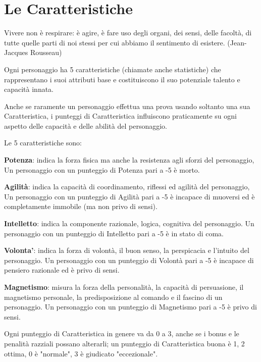 \documentclass[a4paper,11pt,twoside,openany]{book}
\begin{document}
\section{Le Caratteristiche}

\label{le-caratteristiche}

\begin{tcolorbox}[enhanced,arc=5pt,boxrule=0.3pt]{Vivere non è respirare: è agire, è fare uso degli organi, dei sensi, delle facoltà, di tutte quelle parti di noi stessi per cui abbiamo il sentimento di esistere. (Jean-Jacques Rousseau)}\end{tcolorbox}\medskip

Ogni personaggio ha 5 caratteristiche (chiamate anche statistiche) che rappresentano i suoi attributi base e costituiscono il suo potenziale talento e capacità innata.

Anche se raramente un personaggio effettua una prova usando soltanto una sua Caratteristica, i punteggi di Caratteristica influiscono praticamente su ogni aspetto delle capacità e delle abilità del personaggio.

Le 5 caratteristiche sono:

\textbf{Potenza}: indica la forza fisica ma anche la resistenza agli sforzi del personaggio, Un personaggio con un punteggio di Potenza pari a -5 è morto.

\textbf{Agilità}: indica la capacità di coordinamento, riflessi ed agilità del personaggio, Un personaggio con un punteggio di Agilità pari a -5 è incapace di muoversi ed è completamente immobile (ma non privo di sensi).

\textbf{Intelletto}: indica la componente razionale, logica, cognitiva del personaggio. Un personaggio con un punteggio di Intelletto pari a -5 è in stato di coma.

\textbf{Volonta'}: indica la forza di volontà, il buon senso, la perspicacia e l'intuito del personaggio. Un personaggio con un punteggio di Volontà pari a -5 è incapace di pensiero razionale ed è privo di sensi.

\textbf{Magnetismo}: misura la forza della personalità, la capacità di persuasione, il magnetismo personale, la predisposizione al comando e il fascino di un personaggio. Un personaggio con un punteggio di Magnetismo pari a -5 è privo di sensi.

\smallskip

Ogni punteggio di Caratteristica in genere va da 0 a 3, anche se i bonus e le penalità razziali possano alterarli; un punteggio di Caratteristica buona è 1, 2 ottima, 0 è "normale", 3 è giudicato "eccezionale".
\end{document}
